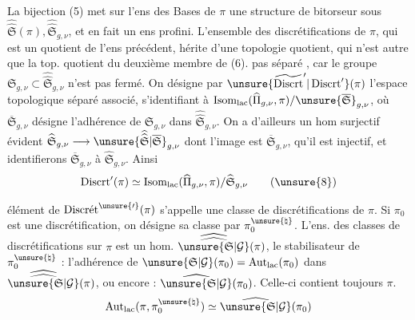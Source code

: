 La bijection (5) met sur l'ens des Bases de $\pi$ une structure de bitorseur sous $\widehat{\widehat{\mathfrak S}}(\pi),\widehat{\widehat{\mathfrak S}}_{g,\nu}$, et    en fait un ens profini. L'ensemble des discrétifications de $\pi$, qui est un quotient de l'ens précédent, hérite d'une topologie quotient, qui n'est autre que la top. quotient du deuxième membre de (6).   pas séparé , car le groupe $\mathfrak S_{g,\nu}\subset\widehat{\widehat{\mathfrak S}}_{g,\nu}$ n'est pas fermé. On désigne par $\unsure{\widetilde{\operatorname{Discrt}}'|\operatorname{Discrt}'}(\pi)$ l'espace topologique séparé associé, s'identifiant à $\operatorname{Isom}_{\mathrm{lac}}(\widehat{\Pi}_{g,\nu},\pi)/\unsure{\overline{\mathfrak S}}_{g,\nu}$, où $\overline{\mathfrak S}_{g,\nu}$ désigne l'adhérence de $\mathfrak S_{g,\nu}$ dans $\widehat{\widehat{\mathfrak S}}_{g,\nu}$. On a d'ailleurs un hom surjectif évident $\widehat{\mathfrak S}_{g,\nu}\longrightarrow\unsure{\widehat{\widehat{\mathfrak S}}|\overline{\mathfrak S}}_{g,\nu}$ dont l'image est $\overline{\mathfrak S}_{g,\nu}$,  qu'il est injectif, et identifierons $\overline{\mathfrak S}_{g,\nu}$ à $\widehat{\mathfrak S}_{g,\nu}$. Ainsi
\[
\operatorname{Discrt}'(\pi)\simeq\operatorname{Isom}_{\mathrm{lac}}(\widehat{\Pi}_{g,\nu},\pi)/\widehat{\mathfrak S}_{g,\nu}
\tag{\unsure{8}}
\]


 élément de $\operatorname{Discr\acute{e}t}^{\unsure{\prime}}(\pi)$ s'appelle une
classe de discrétifications de $\pi$.
Si $\pi_0$ est une discrétification, on désigne sa classe par
$\pi_0^{\unsure{\natural}}$. L'ens. des classes de discrétifications sur $\pi$
est un  hom. $\widehat{\widehat{\unsure{\mathfrak{S}|\mathcal{G}}}}(\pi)$, le stabilisateur
de $\pi_0^{\unsure{\natural}}$  : l'adhérence de
$\unsure{\mathfrak{S}|\mathcal{G}}(\pi_0)=\operatorname{Aut}_{\mathrm{lac}}(\pi_0)$ dans
$\widehat{\widehat{\unsure{\mathfrak{S}|\mathcal{G}}}}(\pi)$, ou encore :
$\widehat{\unsure{\mathfrak{S}|\mathcal{G}}}(\pi_0)$.
Celle-ci contient toujours $\pi$.
\[
\operatorname{Aut}_{\mathrm{lac}}(\pi,\pi_0^{\unsure{\natural}})
\simeq\widehat{\unsure{\mathfrak{S}|\mathcal{G}}}(\pi_0)
\]

